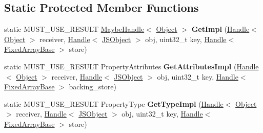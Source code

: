 \subsection*{Static Protected Member Functions}
\begin{DoxyCompactItemize}
\item 
\hypertarget{classv8_1_1internal_1_1_dictionary_elements_accessor_ab1b19bd7122b87612f965f9c15d98573}{}static M\+U\+S\+T\+\_\+\+U\+S\+E\+\_\+\+R\+E\+S\+U\+L\+T \hyperlink{classv8_1_1internal_1_1_maybe_handle}{Maybe\+Handle}$<$ \hyperlink{classv8_1_1internal_1_1_object}{Object} $>$ {\bfseries Get\+Impl} (\hyperlink{classv8_1_1internal_1_1_handle}{Handle}$<$ \hyperlink{classv8_1_1internal_1_1_object}{Object} $>$ receiver, \hyperlink{classv8_1_1internal_1_1_handle}{Handle}$<$ \hyperlink{classv8_1_1internal_1_1_j_s_object}{J\+S\+Object} $>$ obj, uint32\+\_\+t key, \hyperlink{classv8_1_1internal_1_1_handle}{Handle}$<$ \hyperlink{classv8_1_1internal_1_1_fixed_array_base}{Fixed\+Array\+Base} $>$ store)\label{classv8_1_1internal_1_1_dictionary_elements_accessor_ab1b19bd7122b87612f965f9c15d98573}

\item 
\hypertarget{classv8_1_1internal_1_1_dictionary_elements_accessor_a38a4ec8d361f54fedeca24cd44f1d358}{}static M\+U\+S\+T\+\_\+\+U\+S\+E\+\_\+\+R\+E\+S\+U\+L\+T Property\+Attributes {\bfseries Get\+Attributes\+Impl} (\hyperlink{classv8_1_1internal_1_1_handle}{Handle}$<$ \hyperlink{classv8_1_1internal_1_1_object}{Object} $>$ receiver, \hyperlink{classv8_1_1internal_1_1_handle}{Handle}$<$ \hyperlink{classv8_1_1internal_1_1_j_s_object}{J\+S\+Object} $>$ obj, uint32\+\_\+t key, \hyperlink{classv8_1_1internal_1_1_handle}{Handle}$<$ \hyperlink{classv8_1_1internal_1_1_fixed_array_base}{Fixed\+Array\+Base} $>$ backing\+\_\+store)\label{classv8_1_1internal_1_1_dictionary_elements_accessor_a38a4ec8d361f54fedeca24cd44f1d358}

\item 
\hypertarget{classv8_1_1internal_1_1_dictionary_elements_accessor_a9a53036d6da9b3a12def06fc7e88d31b}{}static M\+U\+S\+T\+\_\+\+U\+S\+E\+\_\+\+R\+E\+S\+U\+L\+T Property\+Type {\bfseries Get\+Type\+Impl} (\hyperlink{classv8_1_1internal_1_1_handle}{Handle}$<$ \hyperlink{classv8_1_1internal_1_1_object}{Object} $>$ receiver, \hyperlink{classv8_1_1internal_1_1_handle}{Handle}$<$ \hyperlink{classv8_1_1internal_1_1_j_s_object}{J\+S\+Object} $>$ obj, uint32\+\_\+t key, \hyperlink{classv8_1_1internal_1_1_handle}{Handle}$<$ \hyperlink{classv8_1_1internal_1_1_fixed_array_base}{Fixed\+Array\+Base} $>$ store)\label{classv8_1_1internal_1_1_dictionary_elements_accessor_a9a53036d6da9b3a12def06fc7e88d31b}


\end{DoxyCompactItemize}
